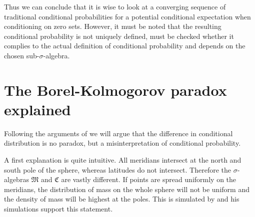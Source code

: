 \documentclass[a4paper]{report}
\theoremstyle{plain}
\theoremstyle{definition}
\theoremstyle{remark}
\numberwithin{equation}{chapter}
\DeclareMathOperator{\1}{\mathbbm{1}}
\begin{document}
Thus we can conclude that it is wise to look at a converging sequence of traditional conditional probabilities for a potential conditional expectation when conditioning on zero sets. However, it must be noted that the resulting conditional probability is not uniquely defined, must be checked whether it complies to the actual definition of conditional probability and depends on the chosen sub-$\sigma$-algebra.

\section{The Borel-Kolmogorov paradox explained}\label{sec:BorelExplained}
Following the arguments of \cite{Gyenis17} we will argue that the difference in conditional distribution is no paradox, but a misinterpretation of conditional probability.

A first explanation is quite intuitive. All meridians intersect at the north and south pole of the sphere, whereas latitudes do not intersect. Therefore the $\sigma$-algebras $\mathfrak{M}$ and $\mathfrak{C}$ are vastly different. If points are spread uniformly on the meridians, the distribution of mass on the whole sphere will not be uniform and the density of mass will be highest at the poles. This is simulated by \cite{Weisstein} and his simulations support this statement.
\end{document}
